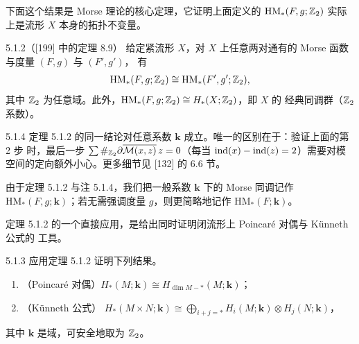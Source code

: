 下面这个结果是 Morse 理论的核心定理，它证明上面定义的
$\mathrm{HM}_*(F,g;\mathbb{Z}_2)$ 实际上是流形 $X$ 本身的拓扑不变量。

\begin{wthm}{5.1.2}（[199] 中的定理 8.9）
给定紧流形 $X$，对 $X$ 上任意两对通有的 Morse 函数与度量 $(F,g)$ 与 $(F',g')$，
有
\[
\mathrm{HM}_*(F,g;\mathbb{Z}_2)\cong\mathrm{HM}_*(F',g';\mathbb{Z}_2),
\]
其中 $\mathbb{Z}_2$ 为任意域。此外，$\mathrm{HM}_*(F,g;\mathbb{Z}_2)\cong H_*(X;\mathbb{Z}_2)$，即 $X$ 的
经典同调群（$\mathbb{Z}_2$ 系数）。
\end{wthm}



\begin{wrem}{5.1.4}
定理 5.1.2 的同一结论对任意系数 $\mathbf k$ 成立。唯一的区别在于：验证上面的第 2 步
时，最后一步
$\sum\#_{\mathbb{Z}_2}\partial\overline{\mathcal M(x,z)}\,z=0$（每当
$\operatorname{ind}(x)-\operatorname{ind}(z)=2$）需要对模空间的定向额外小心。更多细节见 [132] 的 6.6 节。
\end{wrem}

由于定理 5.1.2 与注 5.1.4，我们把一般系数 $\mathbf k$ 下的 Morse 同调记作
$\mathrm{HM}_*(F,g;\mathbf k)$；若无需强调度量 $g$，则更简略地记作
$\mathrm{HM}_*(F;\mathbf k)$。

定理 5.1.2 的一个直接应用，是给出同时证明闭流形上 Poincaré 对偶与 Künneth 公式的
工具。

\begin{wexer}{5.1.3}
应用定理 5.1.2 证明下列结果。
\begin{enumerate}[label=(\roman*)]
  \item （Poincaré 对偶）$H_*(M;\mathbf k)\cong H_{\dim M-*}(M;\mathbf k)$；
  \item （Künneth 公式）
        $H_*(M\times N;\mathbf k)\cong
        \bigoplus_{i+j=*}H_i(M;\mathbf k)\otimes H_j(N;\mathbf k)$，
\end{enumerate}
其中 $\mathbf k$ 是域，可安全地取为 $\mathbb{Z}_2$。
\end{wexer}

